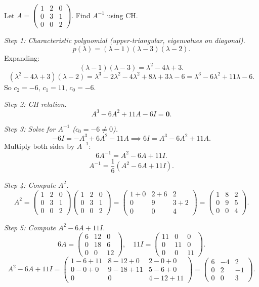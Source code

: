 \documentclass[12pt,a4paper]{article}
\begin{document}
Let \(A = \begin{pmatrix}1 & 2 & 0 \\ 0 & 3 & 1 \\ 0 & 0 & 2\end{pmatrix}\). Find \(A^{-1}\) using CH.

\textit{Step 1: Characteristic polynomial (upper-triangular, eigenvalues on diagonal).}
\[
  p(\lambda) = (\lambda-1)(\lambda-3)(\lambda-2).
\]
Expanding:
\[
  (\lambda-1)(\lambda-3) = \lambda^2 - 4\lambda + 3.
\]
\[
  (\lambda^2-4\lambda+3)(\lambda-2) = \lambda^3 - 2\lambda^2 - 4\lambda^2 + 8\lambda + 3\lambda - 6 = \lambda^3 - 6\lambda^2 + 11\lambda - 6.
\]
So \(c_2 = -6\), \(c_1 = 11\), \(c_0 = -6\).

\textit{Step 2: CH relation.}
\[
  A^3 - 6A^2 + 11A - 6I = \mathbf{0}.
\]

\textit{Step 3: Solve for \(A^{-1}\) (\(c_0 = -6 \neq 0\)).}
\[
  -6I = -A^3 + 6A^2 - 11A \implies 6I = A^3 - 6A^2 + 11A.
\]
Multiply both sides by \(A^{-1}\):
\[
  6A^{-1} = A^2 - 6A + 11I.
\]
\[
  A^{-1} = \frac{1}{6}(A^2 - 6A + 11I).
\]

\textit{Step 4: Compute \(A^2\).}
\[
  A^2 = \begin{pmatrix}1&2&0\\0&3&1\\0&0&2\end{pmatrix}\begin{pmatrix}1&2&0\\0&3&1\\0&0&2\end{pmatrix}
  = \begin{pmatrix}1+0&2+6&2\\0&9&3+2\\0&0&4\end{pmatrix} = \begin{pmatrix}1&8&2\\0&9&5\\0&0&4\end{pmatrix}.
\]

\textit{Step 5: Compute \(A^2 - 6A + 11I\).}
\[
  6A = \begin{pmatrix}6&12&0\\0&18&6\\0&0&12\end{pmatrix}, \quad
  11I = \begin{pmatrix}11&0&0\\0&11&0\\0&0&11\end{pmatrix}.
\]
\[
  A^2 - 6A + 11I = \begin{pmatrix}1-6+11 & 8-12+0 & 2-0+0 \\ 0-0+0 & 9-18+11 & 5-6+0 \\ 0&0& 4-12+11\end{pmatrix}
  = \begin{pmatrix}6 & -4 & 2 \\ 0 & 2 & -1 \\ 0 & 0 & 3\end{pmatrix}.
\]
\end{document}
